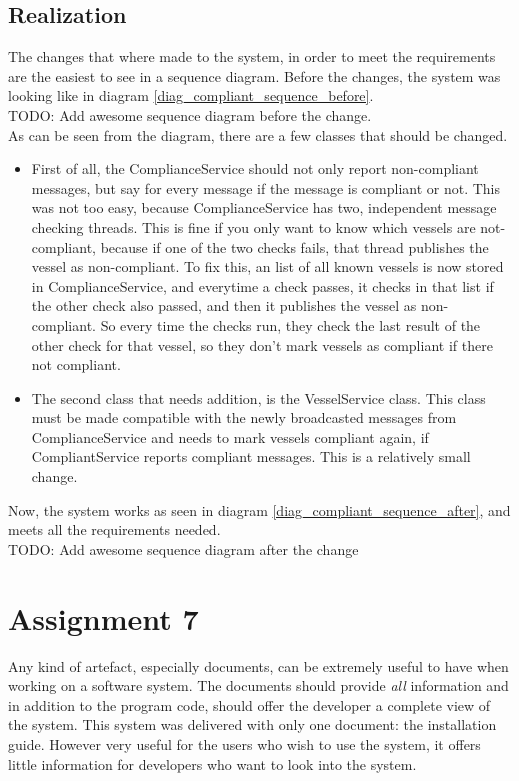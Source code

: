 \documentclass[12pt]{article}
\begin{document}
\subsection*{Realization}
The changes that where made to the system, in order to meet the requirements are the easiest to see in a sequence diagram. Before the changes, the system was looking like in diagram \ref{diag_compliant_sequence_before}.
\\
TODO: Add awesome sequence diagram before the change.
\\
As can be seen from the diagram, there are a few classes that should be changed.
\begin{itemize}
\item First of all, the ComplianceService should not only report non-compliant messages, but say for every message if the message is compliant or not. This was not too easy, because ComplianceService has two, independent message checking threads. This is fine if you only want to know which vessels are not-compliant, because if one of the two checks fails, that thread publishes the vessel as non-compliant. To fix this, an list of all known vessels is now stored in ComplianceService, and everytime a check passes, it checks in that list if the other check also passed, and then it publishes the vessel as non-compliant. So every time the checks run, they check the last result of the other check for that vessel, so they don't mark vessels as compliant if there not compliant.
\item The second class that needs addition, is the VesselService class. This class must be made compatible with the newly broadcasted messages from ComplianceService and needs to mark vessels compliant again, if CompliantService reports compliant messages. This is a relatively small change.
\end{itemize}

Now, the system works as seen in diagram \ref{diag_compliant_sequence_after}, and meets all the requirements needed.
\\
TODO: Add awesome sequence diagram after the change


\section*{Assignment 7}
Any kind of artefact, especially documents, can be extremely useful to have when working on a software system. The documents should provide \emph{all} information and in addition to the program code, should offer the developer a complete view of the system. This system was delivered with only one document: the installation guide. However very useful for the users who wish to use the system, it offers little information for developers who want to look into the system.
\end{document}
